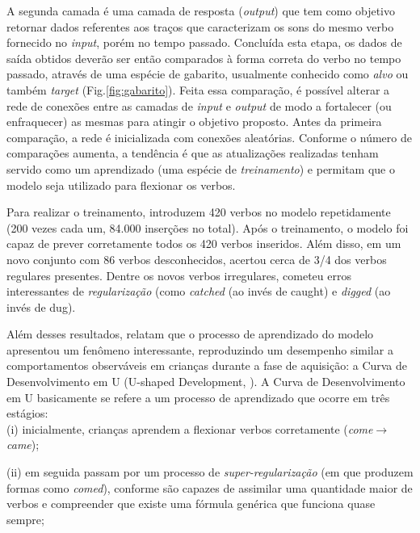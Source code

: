 A segunda camada é uma camada de resposta (\textit{output}) que tem como objetivo retornar dados referentes aos traços que caracterizam os sons do mesmo verbo fornecido no \textit{input}, porém no tempo passado. Concluída esta etapa, os dados de saída obtidos deverão ser então comparados à forma correta do verbo no tempo passado, através de uma espécie de gabarito, usualmente conhecido como \textit{alvo} ou também \textit{target} (Fig.\ref{fig:gabarito}). Feita essa comparação, é possível alterar a rede de conexões entre as camadas de \textit{input} e \textit{output} de modo a fortalecer (ou enfraquecer) as mesmas para atingir o objetivo proposto. Antes da primeira comparação, a rede é inicializada com conexões aleatórias. Conforme o número de comparações aumenta, a tendência é que as atualizações realizadas tenham servido como um aprendizado (uma espécie de \textit{treinamento}) e permitam que o modelo seja utilizado para flexionar os verbos.



Para realizar o treinamento, \cite{rumelhart:1986} introduzem 420 verbos no modelo repetidamente (200 vezes cada um, 84.000 inserções no total).  Após o treinamento, o modelo foi capaz de prever corretamente todos os 420 verbos inseridos. Além disso, em um novo conjunto com 86 verbos desconhecidos, acertou cerca de 3/4 dos verbos regulares presentes. Dentre os novos verbos irregulares, cometeu erros interessantes de \textit{regularização} (como \textit{catched} (ao invés de caught) e \textit{digged} (ao invés de dug). %

Além desses resultados, \cite{rumelhart:1986} relatam que o processo de aprendizado do modelo apresentou um fenômeno interessante, reproduzindo um desempenho similar a comportamentos observáveis em crianças durante a fase de aquisição: a Curva de Desenvolvimento em U (U-shaped Development, \cite{marcus:1992}). A Curva de Desenvolvimento em U basicamente se refere a um processo de aprendizado que ocorre em três estágios: \\

(i) inicialmente, crianças aprendem a flexionar verbos corretamente (\textit{come}$\rightarrow$\textit{came});

(ii) em seguida passam por um processo de \textit{super-regularização} (em que produzem formas como \textit{comed}), conforme são capazes de assimilar uma quantidade maior de verbos e compreender que existe uma fórmula genérica que funciona quase sempre;

